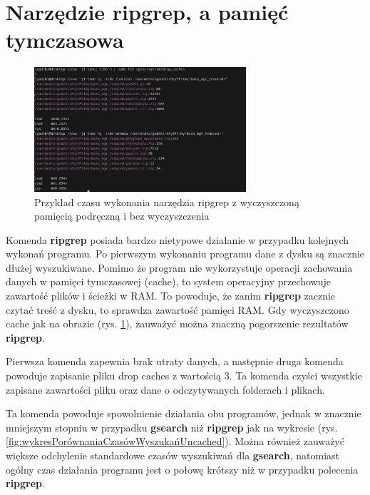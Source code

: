 \section{Narzędzie ripgrep, a pamięć tymczasowa}


\begin{figure}[htbp]
    \centering
    \includegraphics[width=0.7\textwidth]{./images/ripgrep-clear-cache-slow.png}
    \caption{Przykład czasu wykonania narzędzia ripgrep z wyczyszczoną pamięcią
    podręczną i bez wyczyszczenia}
    \label{fig:ClearCacheRipgrep}
\end{figure}

Komenda \textbf{ripgrep} posiada bardzo nietypowe działanie w przypadku kolejnych wykonań 
programu. Po pierwszym wykonaniu programu dane z dysku są znacznie dłużej
wyszukiwane. Pomimo że program nie wykorzystuje operacji zachowania danych
w pamięci tymczasowej (cache), to system operacyjny przechowuje zawartość plików 
i ścieżki w RAM. To powoduje, że zanim \textbf{ripgrep} zacznie czytać treść z 
dysku, to sprawdza zawartość pamięci RAM. Gdy 
wyczyszczono cache jak na obrazie (rys. \ref{fig:ClearCacheRipgrep}),
zauważyć można znaczną pogorszenie rezultatów \textbf{ripgrep}. 

Pierwsza komenda zapewnia brak utraty
danych, a następnie druga komenda powoduje zapisanie pliku drop caches z wartością 3.
Ta komenda czyści wszystkie zapisane zawartości pliku oraz dane o odczytywanych
folderach i plikach.

Ta komenda powoduje spowolnienie działania obu programów, jednak w znacznie
mniejszym stopniu w przypadku \textbf{gsearch} niż \textbf{ripgrep} jak na wykresie (rys. \ref{fig:wykresPorównaniaCzasówWyszukańUncached}).
Można również zauważyć większe odchylenie standardowe czasów wyszukiwań dla \textbf{gsearch}, natomiast
ogólny czas działania programu jest o połowę krótszy niż w przypadku polecenia \textbf{ripgrep}.

